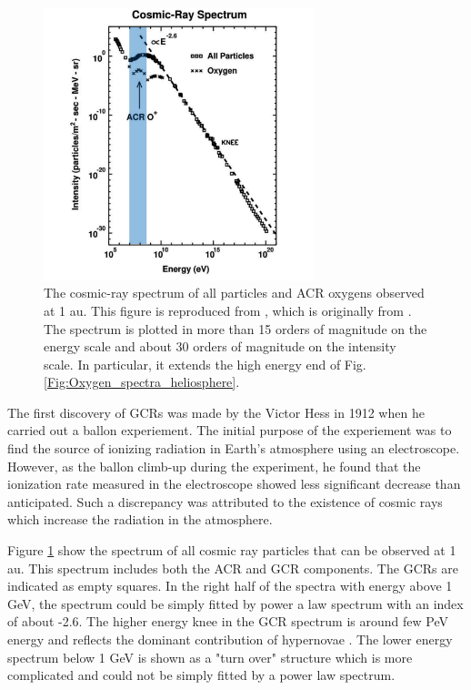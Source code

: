 \label{Sec:GCR}
\begin{figure}[htb]
	\centering
	\includegraphics[width = 0.7\textwidth]{images/gcr_spectra_shadow.png}
	\caption[The cosmic-ray spectrum of all particles at 1 au]{The cosmic-ray spectrum of all particles and \ac{ACR} oxygens observed at 1 au. This figure is reproduced from \citet{Giacalone2022SSRv, Giacalone2012SSRv}, which is originally from \citet{Jokipii1990AIPC}.
	The spectrum is plotted in more than 15 orders of magnitude on the energy scale and about 30 orders of magnitude on the intensity scale. In particular, it extends the high energy end of Fig.\ref{Fig:Oxygen_spectra_heliosphere}.}
	\label{Fig:Oxygen_spectra_cosmic_ray}
\end{figure}
The first discovery of \acp{GCR} was made by the Victor Hess in 1912 when he carried out a ballon experiement. The initial purpose of the experiement was to find the source of ionizing radiation in Earth's atmosphere using an electroscope. However, as the ballon climb-up during the experiment, he found that the ionization rate measured in the electroscope showed less significant decrease than anticipated. Such a discrepancy was attributed to the existence of cosmic rays which increase the radiation in the atmosphere.

Figure \ref{Fig:Oxygen_spectra_cosmic_ray} show the spectrum of all cosmic ray particles that can be observed at 1 au. This spectrum includes both the \ac{ACR} and \ac{GCR} components. The \acp{GCR} are indicated as empty squares. In the right half of the spectra with energy above 1 GeV, the spectrum could be simply fitted by power a law spectrum with an index of about -2.6. The higher energy knee in the \ac{GCR} spectrum is around few PeV energy and reflects the dominant contribution of hypernovae \citep{Sveshnikova2003AA, Hoerandel2003APh}. The lower energy spectrum  below 1 GeV is shown as a "turn over" structure which is more complicated and could not be simply fitted by a power law spectrum. 

